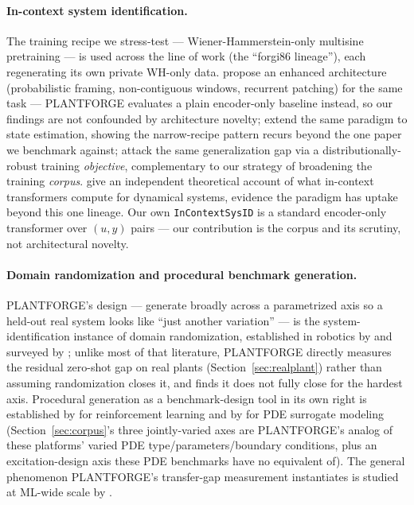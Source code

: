 \documentclass{article}
\begin{document}
\paragraph{In-context system identification.}
The training recipe we stress-test --- Wiener-Hammerstein-only multisine
pretraining --- is used across the \citet{forgione2023system,
piga2024adaptation} line of work (the ``forgi86 lineage''), each regenerating
its own private WH-only data. \citet{rufolo2025enhanced} propose an enhanced
architecture (probabilistic framing, non-contiguous windows, recurrent
patching) for the same task --- PLANTFORGE evaluates a plain encoder-only
baseline instead, so our findings are not confounded by architecture
novelty; \citet{busetto2024incontext} extend the same paradigm to state
estimation, showing the narrow-recipe pattern recurs beyond the one paper we
benchmark against; \citet{rufolo2025distributionally} attack the same
generalization gap via a distributionally-robust training \emph{objective},
complementary to our strategy of broadening the training \emph{corpus}.
\citet{akram2024transformers} give an independent theoretical account of
what in-context transformers compute for dynamical systems, evidence the
paradigm has uptake beyond this one lineage. Our own \texttt{InContextSysID}
is a standard encoder-only transformer over $(u,y)$ pairs --- our
contribution is the corpus and its scrutiny, not architectural novelty.

\paragraph{Domain randomization and procedural benchmark generation.}
PLANTFORGE's design --- generate broadly across a parametrized axis so a
held-out real system looks like ``just another variation'' --- is the
system-identification instance of domain randomization, established in
robotics by \citet{tobin2017domain} and surveyed by \citet{muratore2022robot};
unlike most of that literature, PLANTFORGE directly measures the residual
zero-shot gap on real plants (Section~\ref{sec:realplant}) rather than
assuming randomization closes it, and finds it does not fully close for the
hardest axis. Procedural generation as a benchmark-design tool in its own
right is established by \citet{cobbe2020leveraging} for reinforcement
learning and by \citet{takamoto2022pdebench, gupta2022towards} for PDE
surrogate modeling (Section~\ref{sec:corpus}'s three jointly-varied axes are
PLANTFORGE's analog of these platforms' varied PDE type/parameters/boundary
conditions, plus an excitation-design axis these PDE benchmarks have no
equivalent of). The general phenomenon PLANTFORGE's transfer-gap measurement
instantiates is studied at ML-wide scale by \citet{koh2021wilds}.
\end{document}
